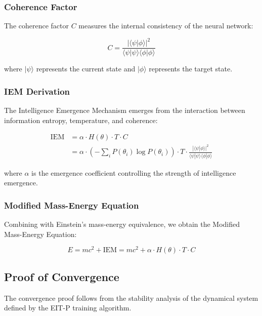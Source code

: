 \documentclass[12pt]{article}
\begin{document}
\subsubsection{Coherence Factor}

The coherence factor $C$ measures the internal consistency of the neural network:

\begin{equation}
C = \frac{|\langle \psi | \phi \rangle|^2}{\langle \psi | \psi \rangle \langle \phi | \phi \rangle}
\end{equation}

where $|\psi\rangle$ represents the current state and $|\phi\rangle$ represents the target state.

\subsubsection{IEM Derivation}

The Intelligence Emergence Mechanism emerges from the interaction between information entropy, temperature, and coherence:

\begin{align}
\text{IEM} &= \alpha \cdot H(\theta) \cdot T \cdot C \\
&= \alpha \cdot \left(-\sum_{i} P(\theta_i) \log P(\theta_i)\right) \cdot T \cdot \frac{|\langle \psi | \phi \rangle|^2}{\langle \psi | \psi \rangle \langle \phi | \phi \rangle}
\end{align}

where $\alpha$ is the emergence coefficient controlling the strength of intelligence emergence.

\subsubsection{Modified Mass-Energy Equation}

Combining with Einstein's mass-energy equivalence, we obtain the Modified Mass-Energy Equation:

\begin{equation}
E = mc^2 + \text{IEM} = mc^2 + \alpha \cdot H(\theta) \cdot T \cdot C
\end{equation}

\subsection{Proof of Convergence}

The convergence proof follows from the stability analysis of the dynamical system defined by the EIT-P training algorithm.
\end{document}

